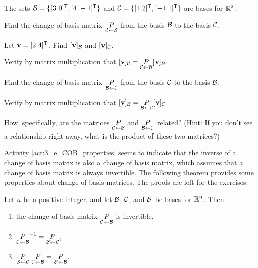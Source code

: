 \begin{activity} \label{act:3_e_COB_properties} The sets $\mathcal{B} = \{[3 \ 0]^{\mathsf{T}}, [4 \ -1]^{\mathsf{T}}\}$ and $\CC = \{[1 \ 2]^{\tr}, [-1 \ 1]^{\tr}\}$ are bases for $\mathbb{R}^2$.
	\ba
	\item Find the change of basis matrix $\underset{\mathcal{C} \leftarrow \mathcal{B}}{P}$ from the basis $\mathcal{B}$ to the basis $\mathcal{C}$.
	
	
	
	\item Let $\mathbf{v}= [2 \ 4]^{\mathsf{T}}$. Find $[\mathbf{v}]_{\mathcal{B}}$ and $[\mathbf{v}]_{\mathcal{C}}$.
	
	
	
	\item Verify by matrix multiplication that $[\mathbf{v}]_{\mathcal{C}} = \underset{\mathcal{C} \leftarrow \mathcal{B}}{P} [\mathbf{v}]_{\mathcal{B}}$.
	
	
	
	\item Find the change of basis matrix $\underset{\mathcal{B} \leftarrow \mathcal{C}}{P}$ from the basis $\mathcal{C}$ to the basis $\mathcal{B}$.
	
	
	
	\item Verify by matrix multiplication that $[\mathbf{v}]_{\mathcal{B}} = \underset{\mathcal{B} \leftarrow \mathcal{C}}{P} [\mathbf{v}]_{\mathcal{C}}$.
	
	
	
	\item How, specifically, are the matrices $\underset{\mathcal{C} \leftarrow \mathcal{B}}{P}$ and $\underset{\mathcal{B} \leftarrow \mathcal{C}}{P}$ related? (Hint: If you don't see a relationship right away, what is the product of these two matrices?)
	
	

	\ea
		
\end{activity}



Activity \ref{act:3_e_COB_properties} seems to indicate that the inverse of a change of basis matrix is also a change of basis matrix, which assumes that a change of basis matrix is always invertible. The following theorem provides some properties about change of basis matrices. The proofs are left for the exercises.

\begin{theorem} \label{thm:3_e_COB_properties} Let $n$ be a positive integer, and let $\mathcal{B}$, $\mathcal{C}$, and $\mathcal{S}$ be bases for $\mathbb{R}^n$. Then
\begin{enumerate}
\item the change of basis matrix $\underset{\mathcal{C} \leftarrow \mathcal{B}}{P}$ is invertible,
\item $\underset{\mathcal{C} \leftarrow \mathcal{B}}{P}^{-1} = \underset{\mathcal{B} \leftarrow \mathcal{C}}{P}$,
\item $\underset{\CS \leftarrow \CC}{P} \ \underset{\CC \leftarrow \CB}{P} = \underset{\CS \leftarrow \CB}{P}$.
\end{enumerate}
\end{theorem}


